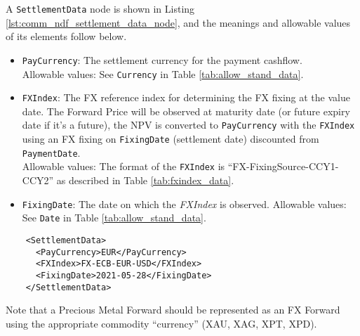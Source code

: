 A \lstinline!SettlementData! node is shown in Listing \ref{lst:comm_ndf_settlement_data_node}, and the meanings and allowable values of its elements follow below.

\begin{itemize}
\item \lstinline!PayCurrency!: The settlement currency for the payment cashflow. \\
Allowable values:  See \lstinline!Currency! in Table \ref{tab:allow_stand_data}.
\item \lstinline!FXIndex!: The FX reference index for determining the FX fixing at the value date. The Forward Price will be observed at maturity date (or future expiry date if it’s a future), the NPV is converted to \lstinline!PayCurrency! with the \lstinline!FXIndex! using an FX fixing on \lstinline!FixingDate! (settlement date) discounted from \lstinline!PaymentDate!. \\
Allowable values: The format of the \lstinline!FXIndex! is ``FX-FixingSource-CCY1-CCY2'' as described in Table \ref{tab:fxindex_data}.
\item \lstinline!FixingDate!: The date on which the \emph{FXIndex} is observed.
Allowable values: See \lstinline!Date! in Table \ref{tab:allow_stand_data}.
\end{itemize}

\begin{listing}[H]
  \begin{verbatim}
    <SettlementData>
      <PayCurrency>EUR</PayCurrency>
      <FXIndex>FX-ECB-EUR-USD</FXIndex>
      <FixingDate>2021-05-28</FixingDate>
    </SettlementData>
  \end{verbatim}
  \caption{Example \lstinline!SettlementData! node with \lstinline!Rules! sub-node}
  \label{lst:comm_ndf_settlement_data_node}
\end{listing}

Note that a Precious Metal Forward should be represented as an FX Forward using the appropriate commodity ``currency'' (XAU, XAG, XPT, XPD).
